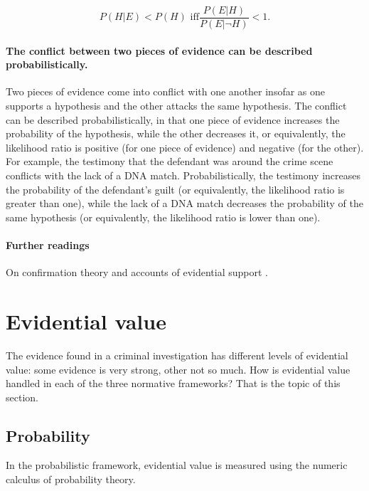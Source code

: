 \documentclass[10pt]{article}
\begin{document}
\[ P(H|E) < P(H) \text{ iff}  \frac{P(E|H)}{P(E|\neg H)} < 1.\]
%

\paragraph{The conflict between two pieces of evidence can be described probabilistically.}
Two pieces of evidence come into 
conflict with one another insofar as one supports a hypothesis 
and the other attacks the same hypothesis. 
The conflict can be described probabilistically, in that one piece of evidence increases 
the probability of the hypothesis, while the other decreases it, or equivalently, the likelihood ratio is positive (for one piece 
of evidence) and negative (for the other). 
For example, the testimony that the defendant was around the crime scene conflicts 
with the lack of a DNA match. Probabilistically, the testimony 
increases the probability of the defendant's guilt (or equivalently, the likelihood ratio is greater than one),
while the lack of a DNA match decreases the probability of the same hypothesis 
(or equivalently, the likelihood ratio is lower than one).

\paragraph{Further readings} 
On confirmation theory and accounts of evidential support \citep{carnap1950, fitelson1999, crupi2015}.

\section{Evidential value}
\label{sec:str}

The evidence found in a criminal investigation has different levels of evidential value: some evidence is very strong, other not so much. How is evidential value handled in each of the three normative frameworks? That is the topic of this section.

\subsection{Probability}

In the probabilistic framework, evidential value is measured using the numeric calculus of probability theory.

	
\end{document}
